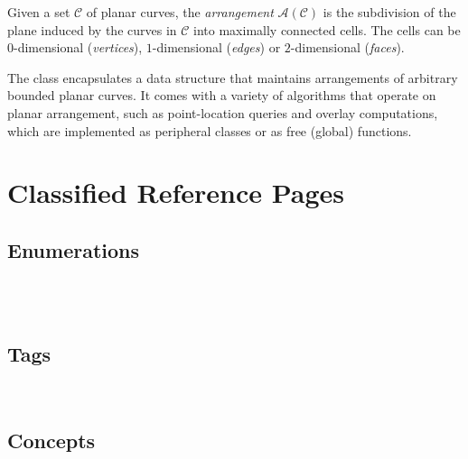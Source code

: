 
Given a set $\mathcal{C}$ of planar curves, the {\em arrangement}
${\mathcal A}({\mathcal C})$ is the subdivision of the plane induced
by the curves in $\mathcal{C}$ into maximally connected cells. The cells
can be $0$-dimensional ({\em vertices}), $1$-dimensional ({\em edges})
or $2$-dimensional ({\em faces}).

The class  encapsulates a data structure
that maintains arrangements of arbitrary bounded planar curves. It comes
with a variety of algorithms that operate on planar arrangement,
such as point-location queries and overlay computations, which are
implemented as peripheral classes or as free (global) functions.

\section{Classified Reference Pages}

\subsection*{Enumerations}

\\
\\

\subsection*{Tags}

\\

\subsection*{Concepts}

